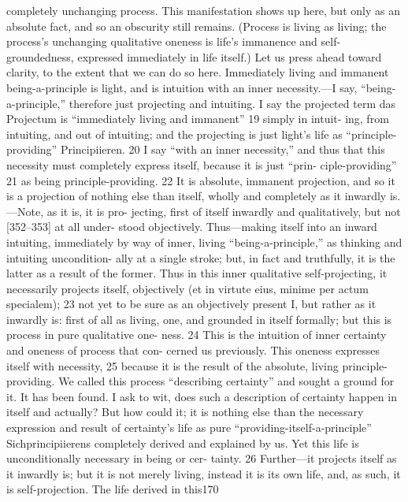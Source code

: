 completely unchanging process. This manifestation shows up here, but only as
an absolute fact, and so an obscurity still remains. (Process is living as living;
the process’s unchanging qualitative oneness is life’s immanence and self-
groundedness, expressed immediately in life itself.) Let us press ahead toward
clarity, to the extent that we can do so here. Immediately living and immanent
being-a-principle is light, and is intuition with an inner necessity.—I say,
“being-a-principle,” therefore just projecting and intuiting. I say the projected
term {das Projectum} is “immediately living and immanent” 19 simply in intuit-
ing, from intuiting, and out of intuiting; and the projecting is just light’s life
as “principle-providing” {Principiieren}. 20 I say “with an inner necessity,” and
thus that this necessity must completely express itself, because it is just “prin-
ciple-providing” 21 as being principle-providing. 22
It is absolute, immanent projection, and so it is a projection of nothing
else than itself, wholly and completely as it inwardly is.—Note, as it is, it is pro-
jecting, first of itself inwardly and qualitatively, but not [352–353] at all under-
stood objectively. Thus—making itself into an inward intuiting, immediately by
way of inner, living “being-a-principle,” as thinking and intuiting uncondition-
ally at a single stroke; but, in fact and truthfully, it is the latter as a result of the
former. Thus in this inner qualitative self-projecting, it necessarily projects
itself, objectively (et in virtute eius, minime per actum specialem); 23 not yet to be
sure as an objectively present I, but rather as it inwardly is: first of all as living,
one, and grounded in itself formally; but this is process in pure qualitative one-
ness. 24 This is the intuition of inner certainty and oneness of process that con-
cerned us previously. This oneness expresses itself with necessity, 25 because it is
the result of the absolute, living principle-providing. We called this process
“describing certainty” and sought a ground for it. It has been found. I ask to
wit, does such a description of certainty happen in itself and actually? But how
could it; it is nothing else than the necessary expression and result of certainty’s
life as pure “providing-itself-a-principle” {Sichprincipiierens} completely derived
and explained by us. Yet this life is unconditionally necessary in being or cer-
tainty. 26 Further—it projects itself as it inwardly is; but it is not merely living,
instead it is its own life, and, as such, it is self-projection. The life derived in this170
